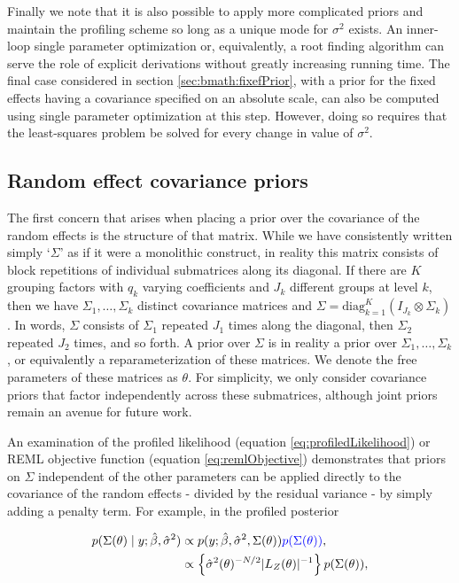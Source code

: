 \documentclass[article,shortnames]{jss}
\begin{document}
Finally we note that it is also possible to apply more complicated priors and maintain the
profiling scheme so long as a unique mode for $\sigma^2$ exists. An
inner-loop single parameter optimization or, equivalently, a root
finding algorithm can serve the role of explicit derivations without
greatly increasing running time. The final case considered in section
\ref{sec:bmath:fixefPrior}, with a prior for the fixed effects having
a covariance specified on an absolute scale, can also be computed using single
parameter optimization at this step. However, doing so requires that the least-squares
problem be solved for every change in value of $\sigma^2$.

\subsection{Random effect covariance priors}
\label{sec:bmath:covPriors}

The first concern that arises when placing a prior over the covariance
of the random effects is the structure of that matrix. While we have
consistently written simply `$\Sigma$' as if it were a monolithic
construct, in reality this matrix consists of block repetitions of
individual submatrices along its diagonal. If there are $K$ grouping
factors with $q_k$ varying coefficients and $J_k$ different groups at
level $k$, then we have $\Sigma_1, \ldots, \Sigma_k$ distinct covariance
matrices and $\Sigma = \mathrm{diag}_{k=1}^K \left( I_{J_k}\otimes
  \Sigma_k \right)$. In words, $\Sigma$ consists of $\Sigma_1$
repeated $J_1$ times along the diagonal, then $\Sigma_2$ repeated
$J_2$ times, and so forth. A prior over $\Sigma$ is in reality a prior
over $\Sigma_1, \ldots, \Sigma_k$, or equivalently a
reparameterization of these matrices. We denote the free parameters of
these matrices as $\theta$. For simplicity, we only consider covariance
priors that factor independently across these submatrices, although
joint priors remain an avenue for future work.

An examination of the profiled likelihood (equation
\ref{eq:profiledLikelihood}) or REML objective function (equation
\ref{eq:remlObjective}) demonstrates that priors on $\Sigma$
independent of the other parameters can be applied
directly to the covariance of the random effects - divided by the
residual variance - by simply adding a penalty term. For example, in the profiled posterior

\begin{align*}
  p(\Sigma(\theta) \mid y; \hat\beta, \hat\sigma^2) & \propto 
  p(y; \hat\beta, \hat\sigma^2, \Sigma(\theta)) {\color{blue} p(\Sigma(\theta))},  \\
  & \propto 
  \left\{\hat{\sigma}^2(\theta)^{-N/2}|L_Z(\theta)|^{-1} \right\}p(\Sigma(\theta)),
\end{align*}
\end{document}

